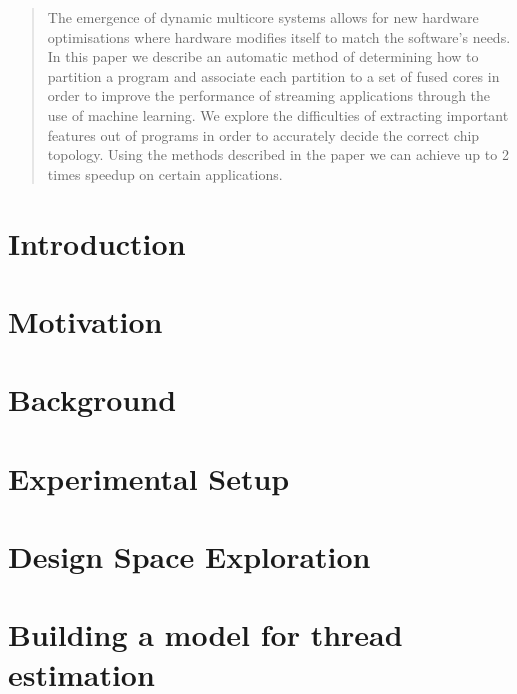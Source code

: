 \documentclass[pageno]{jpaper}
\begin{document}
\title{}

\date{}
\maketitle

\thispagestyle{empty}

\begin{abstract}     
    The emergence of dynamic multicore systems allows for new hardware
    optimisations where hardware modifies itself to match the software's needs.
    In this paper we describe an automatic method of determining how to
    partition a program and associate each partition to a set of fused cores in
    order  to improve the performance of streaming applications through the use
    of machine learning. We explore the difficulties of extracting important
    features out of programs in order to accurately decide the correct chip
    topology.  Using the methods described in the paper we can achieve up to 2
    times speedup on certain applications.
  
\end{abstract}

\section{Introduction}


\section{Motivation}


\section{Background}


\section{Experimental Setup}


\section{Design Space Exploration}


\section{Building a model for thread estimation}

\end{document}

